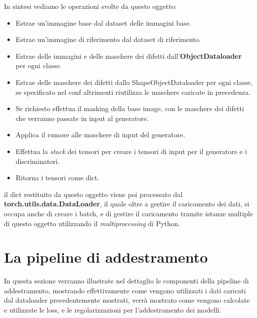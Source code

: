 In sintesi vediamo le operazioni svolte da questo oggetto:

\begin{itemize}
    \item Estrae un'immagine base dal dataset delle immagini base.
    \item Estrae un'immagine di riferimento dal dataset di riferimento.
    \item Estrae delle immagini e delle maschere dei difetti dall'\textbf{ObjectDataloader} per ogni classe.
    \item Estrae delle maschere dei difetti dallo ShapeObjectDataloader per ogni classe, se specificato nel conf altrimenti riutilizza le maschere caricate in precedenza.
    \item Se richiesto effettua il masking della base image, con le maschere dei difetti che verranno passate in input al generatore.
    \item Applica il rumore alle maschere di input del generatore.
    \item Effettua la \textit{stack} dei tensori per creare i tensori di input per il generatore e i discriminatori.
    \item Ritorna i tensori come dict.
\end{itemize}

il dict restituito da questo oggetto viene poi processato dal \textbf{torch.utils.data.DataLoader}, il quale oltre a gestire il caricamento dei dati, 
si occupa anche di creare i batch, e di gestire il caricamento tramite istanze multiple di questo oggetto utilizzando il \textit{multiprocessing} di Python.

\section{La pipeline di addestramento}

In questa sezione verranno illustrate nel dettaglio le componenti della pipeline di addestramento, mostrando effettivamente come vengono utilizzati 
i dati caricati dal dataloader precedentemente mostrati, verrà mostrato come vengono calcolate e utilizzate le loss, 
e le regolarizzazioni per l'addestramento dei modelli.

